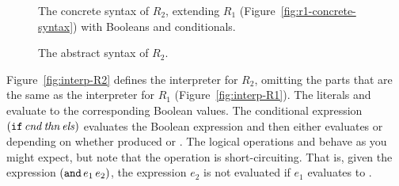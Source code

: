 \documentclass[11pt]{book}
\newcommand{\gray}[1]{{\color{gray} #1}}
\begin{document}
\begin{figure}[tp]
\centering
\fbox{
\begin{minipage}{0.96\textwidth}
\[
\begin{array}{lcl}
  \itm{bool} &::=& \key{\#t} \mid \key{\#f} \\  
  \itm{cmp} &::= & \key{eq?} \mid \key{<} \mid \key{<=} \mid \key{>} \mid \key{>=} \\
  \Exp &::=& \gray{ \Int \mid \CREAD{} \mid \CNEG{\Exp} \mid \CADD{\Exp}{\Exp} }  \mid \CSUB{\Exp}{\Exp} \\
     &\mid&  \gray{ \Var \mid \CLET{\Var}{\Exp}{\Exp} } \\
     &\mid& \itm{bool}
      \mid (\key{and}\;\Exp\;\Exp) \mid (\key{or}\;\Exp\;\Exp)
      \mid (\key{not}\;\Exp) \\
      &\mid& (\itm{cmp}\;\Exp\;\Exp) \mid \CIF{\Exp}{\Exp}{\Exp} \\
  R_2 &::=& \Exp
\end{array}
\]
\end{minipage}
}
\caption{The concrete syntax of $R_2$, extending $R_1$
  (Figure~\ref{fig:r1-concrete-syntax}) with Booleans and conditionals.}
\label{fig:r2-concrete-syntax}
\end{figure}

\begin{figure}[tp]
\centering
\fbox{
\begin{minipage}{0.96\textwidth}
\[
\begin{array}{lcl}
  \itm{bool} &::=& \code{\#t} \mid \code{\#f} \\
  \itm{cmp} &::= & \code{eq?} \mid \code{<} \mid \code{<=} \mid \code{>} \mid \code{>=} \\
  \itm{op} &::= & \itm{cmp} \mid \code{read} \mid \code{+} \mid \code{-}
    \mid \code{and} \mid \code{or} \mid \code{not} \\
  \Exp &::=& \gray{ \INT{\Int} \mid \VAR{\Var} \mid \LET{\Var}{\Exp}{\Exp} } \\
     &\mid& \PRIM{\itm{op}}{\Exp\ldots}\\
     &\mid& \BOOL{\itm{bool}} \mid \IF{\Exp}{\Exp}{\Exp} \\
  R_2 &::=& \PROGRAM{\code{'()}}{\Exp}
\end{array}
\]
\end{minipage}
}
\caption{The abstract syntax of $R_2$.}
\label{fig:r2-syntax}
\end{figure}

Figure~\ref{fig:interp-R2} defines the interpreter for $R_2$, omitting
the parts that are the same as the interpreter for $R_1$
(Figure~\ref{fig:interp-R1}). The literals  and 
evaluate to the corresponding Boolean values. The conditional
expression $(\texttt{if}\, \mathit{cnd}\,\mathit{thn}\,\mathit{els})$ evaluates
the Boolean expression  and then either evaluates 
or  depending on whether  produced  or
. The logical operations  and  behave as
you might expect, but note that the  operation is
short-circuiting. That is, given the expression
$(\texttt{and}\,e_1\,e_2)$, the expression $e_2$ is not evaluated if
$e_1$ evaluates to .
\end{document}
